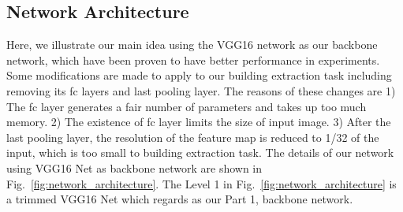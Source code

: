 \subsection{Network Architecture}
 Here, we illustrate our main idea using the VGG16 network as our backbone network, which have been proven to have better performance in experiments.
 Some modifications are made to apply to our building extraction task including removing its fc layers and last pooling layer. The reasons of these changes are
 1) The fc layer generates a fair number of parameters and takes up too much memory.
 2) The existence of fc layer limits the size of input image.
 3) After the last pooling layer, the resolution of the feature map is reduced to 1/32 of the input, which is too small to building extraction task.
 The details of our network using VGG16 Net as backbone network are shown in Fig.~\ref{fig:network_architecture}. The Level 1 in Fig.~\ref{fig:network_architecture} is a trimmed VGG16 Net which regards as our Part 1, backbone network.

